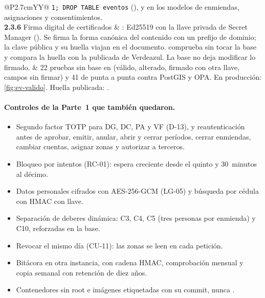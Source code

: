 \documentclass[11pt,a4paper]{article}
\theoremstyle{definition}
\theoremstyle{remark}
\newcommand{\code}[1]{\texttt{#1}}
\begin{document}
{\begin{xltabular}{\linewidth}{@{}P{2.7cm}YY@{}}
  \code{1; DROP TABLE eventos} (), y en los modelos de
  enmiendas, asignaciones y consentimientos. \\
\textbf{2.3.6} Firma digital de certificados &
  : Ed25519 con la llave privada de Secret
  Manager (). Se firma la forma can\'onica del
  contenido con un prefijo de dominio; la clave p\'ublica y su huella viajan en
  el documento.  comprueba sin tocar la base y compara la
  huella con la publicada de Verdeazul. La base no deja modificar lo firmado. &
  22 pruebas sin base en  (v\'alido,
  alterado, firmado con otra llave, campos sin firmar) y 41 de punta a punta
  contra PostGIS y OPA. En producci\'on: \cref{fig:ev-valido}.
  Huella publicada: . \\
\end{xltabular}
}

\paragraph{Controles de la Parte~1 que tambi\'en quedaron.}
\begin{itemize}
  \item Segundo factor TOTP para DG, DC, PA y VF (D-13), y reautenticaci\'on
    antes de aprobar, emitir, anular, abrir y cerrar per\'iodos, cerrar
    enmiendas, cambiar cuentas, asignar zonas y autorizar a terceros.
  \item Bloqueo por intentos (RC-01): espera creciente desde el quinto y
    30~minutos al d\'ecimo.
  \item Datos personales cifrados con AES-256-GCM (LG-05) y b\'usqueda por
    c\'edula con HMAC con llave.
  \item Separaci\'on de deberes din\'amica: C3, C4, C5 (tres personas por
    enmienda) y C10, reforzadas en la base.
  \item Revocar el mismo d\'ia (CU-11): las zonas se leen en cada petici\'on.
  \item Bit\'acora en otra instancia, con cadena HMAC, comprobaci\'on mensual y
    copia semanal con retenci\'on de diez a\~nos.
  \item Contenedores sin root e im\'agenes etiquetadas con su commit, nunca
    .
\end{itemize}
\end{document}
